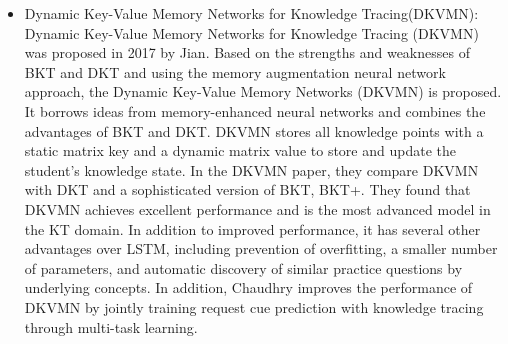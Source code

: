 \begin{itemize}
	\item Dynamic Key-Value Memory Networks for Knowledge Tracing(DKVMN): Dynamic Key-Value Memory Networks for Knowledge Tracing (DKVMN) was proposed in 2017 by Jian\cite{zhang2017dynamic}. Based on the strengths and weaknesses of BKT and DKT and using the memory augmentation neural network approach, the Dynamic Key-Value Memory Networks (DKVMN) is proposed. It borrows ideas from memory-enhanced neural networks and combines the advantages of BKT and DKT. DKVMN stores all knowledge points with a static matrix key and a dynamic matrix value to store and update the student's knowledge state. In the DKVMN paper, they compare DKVMN with DKT and a sophisticated version of BKT, BKT+. They found that DKVMN achieves excellent performance and is the most advanced model in the KT domain. In addition to improved performance, it has several other advantages over LSTM, including prevention of overfitting, a smaller number of parameters, and automatic discovery of similar practice questions by underlying concepts. In addition, Chaudhry\cite{chaudhry2018modeling} improves the performance of DKVMN by jointly training request cue prediction with knowledge tracing through multi-task learning.
\end{itemize}


